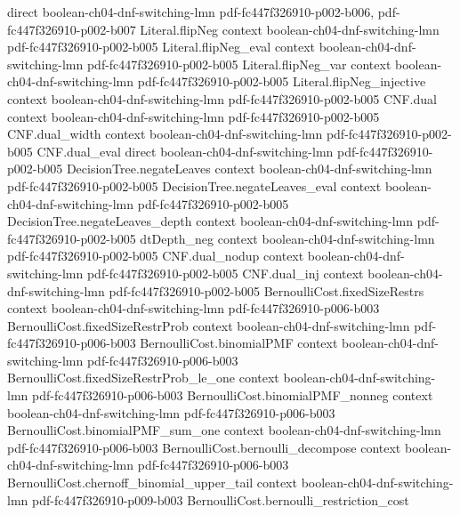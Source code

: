 \begin{theorem}
  {direct}
  {boolean-ch04-dnf-switching-lmn}
  {pdf-fc447f326910-p002-b006,
    pdf-fc447f326910-p002-b007}
\proofstep
  {Literal.flipNeg}
  {context}
  {boolean-ch04-dnf-switching-lmn}
  {pdf-fc447f326910-p002-b005}
\proofstep
  {Literal.flipNeg_eval}
  {context}
  {boolean-ch04-dnf-switching-lmn}
  {pdf-fc447f326910-p002-b005}
\proofstep
  {Literal.flipNeg_var}
  {context}
  {boolean-ch04-dnf-switching-lmn}
  {pdf-fc447f326910-p002-b005}
\proofstep
  {Literal.flipNeg_injective}
  {context}
  {boolean-ch04-dnf-switching-lmn}
  {pdf-fc447f326910-p002-b005}
\proofstep
  {CNF.dual}
  {context}
  {boolean-ch04-dnf-switching-lmn}
  {pdf-fc447f326910-p002-b005}
\proofstep
  {CNF.dual_width}
  {context}
  {boolean-ch04-dnf-switching-lmn}
  {pdf-fc447f326910-p002-b005}
\proofstep
  {CNF.dual_eval}
  {direct}
  {boolean-ch04-dnf-switching-lmn}
  {pdf-fc447f326910-p002-b005}
\proofstep
  {DecisionTree.negateLeaves}
  {context}
  {boolean-ch04-dnf-switching-lmn}
  {pdf-fc447f326910-p002-b005}
\proofstep
  {DecisionTree.negateLeaves_eval}
  {context}
  {boolean-ch04-dnf-switching-lmn}
  {pdf-fc447f326910-p002-b005}
\proofstep
  {DecisionTree.negateLeaves_depth}
  {context}
  {boolean-ch04-dnf-switching-lmn}
  {pdf-fc447f326910-p002-b005}
\proofstep
  {dtDepth_neg}
  {context}
  {boolean-ch04-dnf-switching-lmn}
  {pdf-fc447f326910-p002-b005}
\proofstep
  {CNF.dual_nodup}
  {context}
  {boolean-ch04-dnf-switching-lmn}
  {pdf-fc447f326910-p002-b005}
\proofstep
  {CNF.dual_inj}
  {context}
  {boolean-ch04-dnf-switching-lmn}
  {pdf-fc447f326910-p002-b005}
\proofstep
  {BernoulliCost.fixedSizeRestrs}
  {context}
  {boolean-ch04-dnf-switching-lmn}
  {pdf-fc447f326910-p006-b003}
\proofstep
  {BernoulliCost.fixedSizeRestrProb}
  {context}
  {boolean-ch04-dnf-switching-lmn}
  {pdf-fc447f326910-p006-b003}
\proofstep
  {BernoulliCost.binomialPMF}
  {context}
  {boolean-ch04-dnf-switching-lmn}
  {pdf-fc447f326910-p006-b003}
\proofstep
  {BernoulliCost.fixedSizeRestrProb_le_one}
  {context}
  {boolean-ch04-dnf-switching-lmn}
  {pdf-fc447f326910-p006-b003}
\proofstep
  {BernoulliCost.binomialPMF_nonneg}
  {context}
  {boolean-ch04-dnf-switching-lmn}
  {pdf-fc447f326910-p006-b003}
\proofstep
  {BernoulliCost.binomialPMF_sum_one}
  {context}
  {boolean-ch04-dnf-switching-lmn}
  {pdf-fc447f326910-p006-b003}
\proofstep
  {BernoulliCost.bernoulli_decompose}
  {context}
  {boolean-ch04-dnf-switching-lmn}
  {pdf-fc447f326910-p006-b003}
\proofstep
  {BernoulliCost.chernoff_binomial_upper_tail}
  {context}
  {boolean-ch04-dnf-switching-lmn}
  {pdf-fc447f326910-p009-b003}
\proofstep
  {BernoulliCost.bernoulli_restriction_cost}

\end{theorem}
